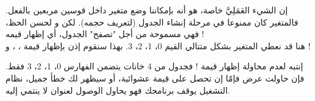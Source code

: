 إن الشيء العَمَلِيَّ خاصة، هو أنه بإمكاننا وضع متغير داخل قوسين مربعين بالفعل. فالمتغير كان ممنوعا في مرحلة إنشاء الجدول (لتعريف حجمه). لكن و لحسن الحظ، فهي مسموحة من أجل "تصفح" الجدول، أي إظهار قيمه !\\
هنا قد نعطي المتغير
بشكل متتالي القيم 0، 1، 2، 3. بهذا سنقوم إذن بإظهار قيمة
،
،
و
 !
\begin{critical}
  إنتبه لعدم محاولة إظهار قيمة
 !
فجدول من 4 خانات يتضمن الفهارس 0، 1، 2، 3 فقط. فإن حاولت عرض
فإمّا إن تحصل على قيمة عشوائية، أو سيظهر لك خطأ جميل، نظام التشغيل يوقف برنامجك فهو يحاول الوصول لعنوان لا ينتمي إليه.
\end{critical}
